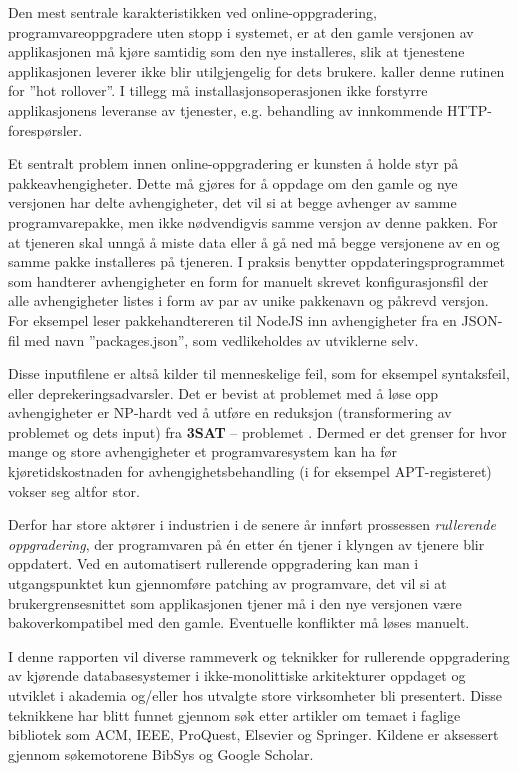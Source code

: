 Den mest sentrale karakteristikken ved online-oppgradering, programvareoppgradere uten stopp i systemet, er at den gamle versjonen av applikasjonen må kjøre samtidig som den nye installeres, slik at tjenestene applikasjonen leverer ikke blir utilgjengelig for dets brukere. \cite{choi2009} kaller denne rutinen for ''hot rollover''. I tillegg må installasjonsoperasjonen ikke forstyrre applikasjonens leveranse av tjenester, e.g. behandling av innkommende HTTP-forespørsler.

Et sentralt problem innen online-oppgradering er kunsten å holde styr på pakkeavhengigheter. Dette må gjøres for å oppdage om den gamle og nye versjonen har delte avhengigheter, det vil si at begge avhenger av samme programvarepakke, men ikke nødvendigvis samme versjon av denne pakken. For at tjeneren skal unngå å miste data eller å gå ned må begge versjonene av en og samme pakke installeres på tjeneren. I praksis benytter oppdateringsprogrammet som handterer avhengigheter en form for manuelt skrevet konfigurasjonsfil der alle avhengigheter listes i form av par av unike pakkenavn og påkrevd versjon. For eksempel leser pakkehandtereren til NodeJS inn avhengigheter fra en JSON-fil med navn ''packages.json'', som vedlikeholdes av utviklerne selv.

Disse inputfilene er altså kilder til menneskelige feil, som for eksempel syntaksfeil, eller deprekeringsadvarsler. Det er bevist at problemet med å løse opp avhengigheter er NP-hardt ved å utføre en reduksjon (transformering av problemet og dets input) fra \textbf{3SAT} -- problemet \citep{dumitracs2009upgrades}. Dermed er det grenser for hvor mange og store avhengigheter et programvaresystem kan ha før kjøretidskostnaden for avhengighetsbehandling (i for eksempel APT-registeret) vokser seg altfor stor.

Derfor har store aktører i industrien i de senere år innført prossessen \emph{rullerende oppgradering}, der programvaren på én etter én tjener i klyngen av tjenere blir oppdatert. Ved en automatisert rullerende oppgradering kan man i utgangspunktet kun gjennomføre patching av programvare, det vil si at brukergrensesnittet som applikasjonen tjener må i den nye versjonen være bakoverkompatibel med den gamle. Eventuelle konflikter må løses manuelt.

I denne rapporten vil diverse rammeverk og teknikker for rullerende oppgradering av kjørende databasesystemer i ikke-monolittiske arkitekturer oppdaget og utviklet i akademia og/eller hos utvalgte store virksomheter bli presentert. Disse teknikkene har blitt funnet gjennom søk etter artikler om temaet i faglige bibliotek som ACM, IEEE, ProQuest, Elsevier og Springer. Kildene er aksessert gjennom søkemotorene BibSys og Google Scholar.

